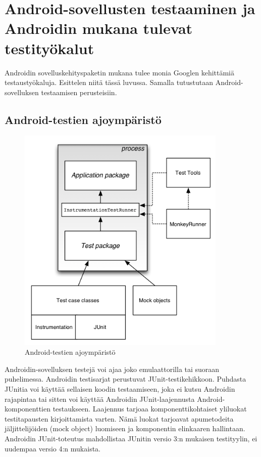 \section{Android-sovellusten testaaminen ja Androidin mukana tulevat testityökalut}

Androidin sovelluskehityspaketin mukana tulee monia Googlen kehittämiä testaustyökaluja. Esittelen niitä tässä luvussa. Samalla tutustutaan Android-sovelluksen testaamisen perusteisiin.

\subsection{Android-testien ajoympäristö}

\begin{figure}[htb]
\includegraphics[width=100mm]{test_framework.png}
\caption{Android-testien ajoympäristö} \label{test_framework}
\end{figure}

Androidin-sovelluksen testejä voi ajaa joko emulaattorilla tai suoraan puhelimessa. Androidin testisarjat perustuvat JUnit-testikehikkoon. Puhdasta JUnitia voi käyttää sellaisen koodin testaamiseen, joka ei kutsu Androidin rajapintaa tai sitten voi käyttää Androidin JUnit-laajennusta Android-komponenttien testaukseen. Laajennus tarjoaa komponenttikohtaiset yliluokat testitapausten kirjoittamista varten. Nämä luokat tarjoavat apumetodeita jäljittelijöiden (mock object) luomiseen ja komponentin elinkaaren hallintaan. Androidin JUnit-toteutus mahdollistaa JUnitin versio 3:n mukaisen testityylin, ei uudempaa versio 4:n mukaista.

